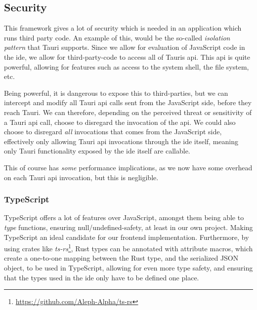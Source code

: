 \subsection{Security}

This framework gives a lot of security which is needed in an
application which runs third party code. An example of this, would be the
so-called \textit{isolation pattern} that Tauri supports. Since we allow for
evaluation of JavaScript code in the \gls*{ide}, we allow for third-party-code to
access all of Tauris \gls*{api}. This \gls*{api} is quite powerful, allowing for
features such as access to the system shell, the file system, etc.

Being powerful, it is dangerous to expose this to third-parties, but we can
intercept and modify all Tauri \gls*{api} calls sent from the JavaScript side,
before they reach Tauri. We can therefore, depending on the perceived threat or
sensitivity of a Tauri \gls*{api} call, choose to disregard the invocation of the
\gls*{api}. We could also choose to disregard \textit{all} invocations that comes
from the JavaScript side, effectively only allowing Tauri \gls*{api} invocations
through the \gls*{ide} itself, meaning only Tauri functionality exposed by the
\gls*{ide} itself are callable.

This of course has \textit{some} performance implications, as we now have some overhead on
each Tauri \gls*{api} invocation, but this is negligible\footnotemark{}.



\subsubsection{TypeScript}

TypeScript offers a lot of features over JavaScript, amongst them being able to
\textit{type} functions, ensuring null/undefined-safety, at least in our own
project. Making TypeScript an ideal candidate for our frontend implementation.
Furthermore, by using crates like \textit{ts-rs}\footnote{\url{https://github.com/Aleph-Alpha/ts-rs}},
Rust types can be annotated with attribute macros, which create a one-to-one
mapping between the Rust type, and the serialized JSON object, to be used in
TypeScript, allowing for even more type safety, and ensuring that the types used
in the \gls*{ide} only have to be defined one place.

